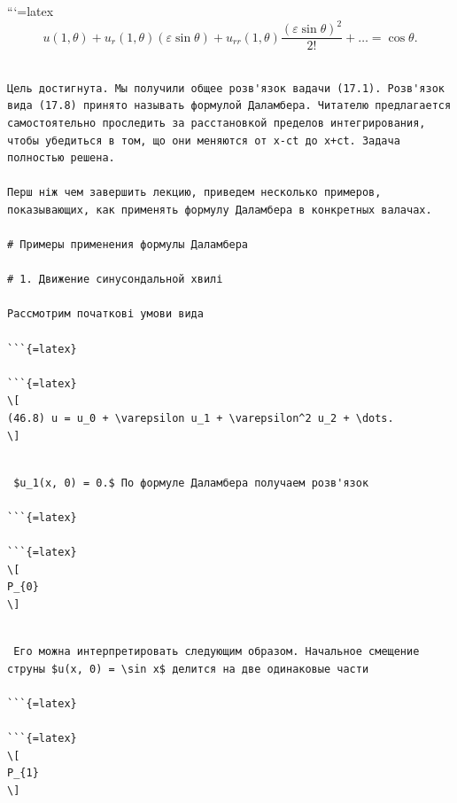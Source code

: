 \documentclass[
  ukrainian,
]{article}
\begin{document}
```{=latex}
\[
u(1, \theta) + u_r(1, \theta) (\varepsilon \sin \theta) + u_{rr}(1, \theta) \frac{(\varepsilon \sin \theta)^2}{2!} + \dots = \cos \theta.
\]

\begin{verbatim}

Цель достигнута. Мы получили общее розв'язок вадачи (17.1). Розв'язок вида (17.8) принято называть формулой Даламбера. Читателю предлагается самостоятельно проследить за расстановкой пределов интегрирования, чтобы убедиться в том, що они меняются от x-ct до x+ct. Задача полностью решена.

Перш ніж чем завершить лекцию, приведем несколько примеров, показывающих, как применять формулу Даламбера в конкретных валачах.

# Примеры применения формулы Даламбера

# 1. Движение синусондальной хвилі

Рассмотрим початкові умови вида

```{=latex}

```{=latex}
\[
(46.8) u = u_0 + \varepsilon u_1 + \varepsilon^2 u_2 + \dots.
\]
\end{verbatim}

\begin{verbatim}

 $u_1(x, 0) = 0.$ По формуле Даламбера получаем розв'язок

```{=latex}

```{=latex}
\[
P_{0}
\]
\end{verbatim}

\begin{verbatim}

 Его можна интерпретировать следующим образом. Начальное смещение струны $u(x, 0) = \sin x$ делится на две одинаковые части

```{=latex}

```{=latex}
\[
P_{1}
\]
\end{verbatim}
\end{document}

